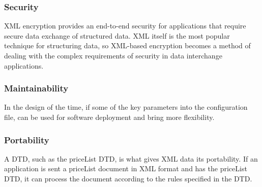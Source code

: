 \subsubsection{Security}
XML encryption provides an end-to-end security for applications that require secure data exchange of structured data. XML itself is the most popular technique for structuring data, so XML-based encryption becomes a method of dealing with the complex requirements of security in data interchange applications.


\subsubsection{Maintainability}
In the design of the time, if some of the key parameters into the configuration file, can be used for software deployment and bring more flexibility.


\subsubsection{Portability}

A DTD, such as the priceList DTD, is what gives XML data its portability. If an application is sent a priceList document in XML format and has the priceList DTD, 
it can process the document according to the rules specified in the DTD.


